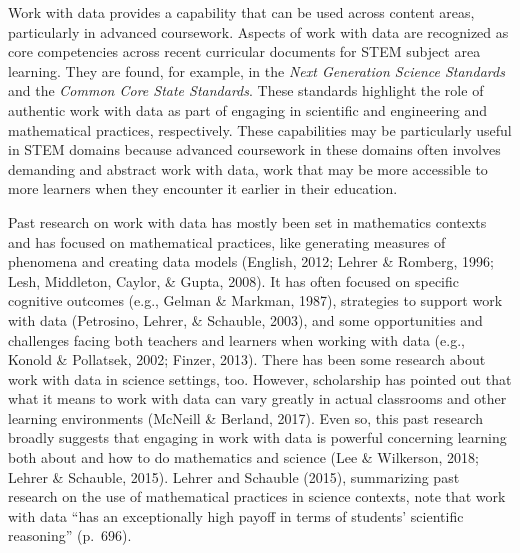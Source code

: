 \documentclass[]{msu-thesis}
\theoremstyle{definition}
\theoremstyle{definition}
\theoremstyle{definition}
\theoremstyle{remark}
\begin{document}
Work with data provides a capability that can be used across content
areas, particularly in advanced coursework. Aspects of work with data
are recognized as core competencies across recent curricular documents
for STEM subject area learning. They are found, for example, in the
\emph{Next Generation Science Standards} and the \emph{Common Core State
Standards}. These standards highlight the role of authentic work with
data as part of engaging in scientific and engineering and mathematical
practices, respectively. These capabilities may be particularly useful
in STEM domains because advanced coursework in these domains often
involves demanding and abstract work with data, work that may be more
accessible to more learners when they encounter it earlier in their
education.

Past research on work with data has mostly been set in mathematics
contexts and has focused on mathematical practices, like generating
measures of phenomena and creating data models (English, 2012; Lehrer \&
Romberg, 1996; Lesh, Middleton, Caylor, \& Gupta, 2008). It has often
focused on specific cognitive outcomes (e.g., Gelman \& Markman, 1987),
strategies to support work with data (Petrosino, Lehrer, \& Schauble,
2003), and some opportunities and challenges facing both teachers and
learners when working with data (e.g., Konold \& Pollatsek, 2002;
Finzer, 2013). There has been some research about work with data in
science settings, too. However, scholarship has pointed out that what it
means to work with data can vary greatly in actual classrooms and other
learning environments (McNeill \& Berland, 2017). Even so, this past
research broadly suggests that engaging in work with data is powerful
concerning learning both about and how to do mathematics and science
(Lee \& Wilkerson, 2018; Lehrer \& Schauble, 2015). Lehrer and Schauble
(2015), summarizing past research on the use of mathematical practices
in science contexts, note that work with data ``has an exceptionally
high payoff in terms of students' scientific reasoning'' (p.~696).
\end{document}
